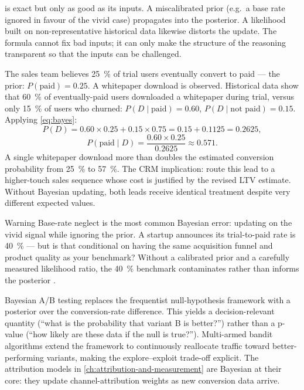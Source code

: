  is exact but only as good as its inputs. A miscalibrated prior (e.g.\ a base rate
ignored in favour of the vivid case) propagates into the posterior. A likelihood built on
non-representative historical data likewise distorts the update. The formula cannot fix bad inputs;
it can only make the structure of the reasoning transparent so that the inputs can be challenged.

\begin{example}
The sales team believes \qty{25}{\percent} of trial users eventually convert to paid --- the prior:
\(P(\text{paid})\!=\!0.25\). A whitepaper download is observed. Historical data show that
\qty{60}{\percent} of eventually-paid users downloaded a whitepaper during trial, versus only
\qty{15}{\percent} of users who churned: \(P(D\mid\text{paid})=0.60\),
\(P(D\mid\text{not paid})=0.15\). Applying \cref{eq:bayes}:
\[
  P(D) = 0.60\times0.25 + 0.15\times0.75 = 0.15 + 0.1125 = 0.2625,
\]
\[
  P(\text{paid}\mid D) = \frac{0.60\times0.25}{0.2625} \approx 0.571.
\]
A single whitepaper download more than doubles the estimated conversion probability from \qty{25}{\percent}
to \qty{57}{\percent}. The CRM implication: route this lead to a higher-touch sales sequence whose
cost is justified by the revised LTV estimate. Without Bayesian updating, both leads receive
identical treatment despite very different expected values.
\end{example}

\begin{admonition}{Warning}
Base-rate neglect is the most common Bayesian error: updating on the vivid signal while ignoring
the prior. A startup announces its trial-to-paid rate is \qty{40}{\percent} --- but is that
conditional on having the same acquisition funnel and product quality as your benchmark? Without
a calibrated prior and a carefully measured likelihood ratio, the \qty{40}{\percent} benchmark
contaminates rather than informs the posterior \parencite{kahneman2011}.
\end{admonition}

Bayesian A/B testing replaces the frequentist null-hypothesis framework with a posterior over the
conversion-rate difference. This yields a decision-relevant quantity (``what is the probability
that variant B is better?'') rather than a p-value (``how likely are these data if the null is
true?''). Multi-armed bandit algorithms extend the framework to continuously reallocate traffic
toward better-performing variants, making the explore--exploit trade-off explicit. The
attribution models in \cref{ch:attribution-and-measurement} are Bayesian at their core:
they update channel-attribution weights as new conversion data arrive.

